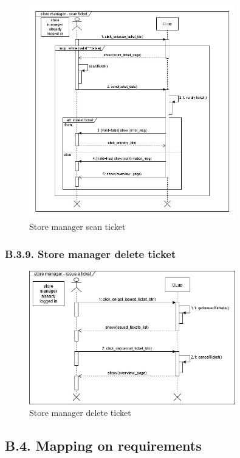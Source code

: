 \begin{figure}[H]
\centering
\includegraphics[width=0.8\textwidth]{sequence_diagrams/sequence_diagram_store_manager_scan_ticket}
\caption{Store manager scan ticket}
\end{figure}

\subsubsection{B.3.9. Store manager delete ticket}

\begin{figure}[H]
\centering
\includegraphics[width=0.8\textwidth]{sequence_diagrams/sequence_diagram_store_manager_cancel_ticket}
\caption{Store manager delete ticket}
\end{figure}

\clearpage
\subsection{B.4. Mapping on requirements}

